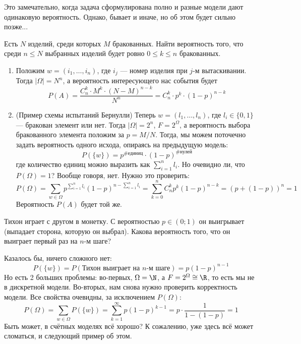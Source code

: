 \begin{itemize}
\begin{enumerate}
		\begin{note}
			Это замечательно, когда задача сформулирована полно и разные модели дают одинаковую вероятность. Однако, бывает и иначе, но об этом будет сильно позже...
		\end{note}
	
		\begin{example}
			Есть $N$ изделий, среди которых $M$ бракованных. Найти вероятность того, что среди $n \le N$ выбранных изделий будет ровно $0 \le k \le n$ бракованных.
		
			\begin{enumerate}
				\item Положим $w = (i_1, \ldots, i_n)$, где $i_j$ --- номер изделия при $j$-м вытаскивании. Тогда $|\Omega| = N^n$, а вероятность интересующего нас события будет
				\[
					P(A) = \frac{C_n^k \cdot M^k \cdot (N - M)^{n - k}}{N^n} = C_n^k \cdot p^k \cdot (1 - p)^{n - k}
				\]
				
				\item (Пример схемы испытаний Бернулли) Теперь $w = (l_1, \ldots, l_n)$, где $l_i \in \{0, 1\}$ --- бракован элемент или нет. Тогда $|\Omega| = 2^n$, $F = 2^\Omega$, а вероятность выбора бракованного элемента положим за $p = M / N$. Тогда, мы можем поточечно задать вероятность одного исхода, опираясь на предыдущую модель:
				\[
					P(\{w\}) = p^{\text{\#единиц}} \cdot (1 - p)^{\text{\#нулей}}
				\]
				где количество единиц можно выразить как $\sum_{i = 1}^n l_i$. Но очевидно ли, что $P(\Omega) = 1$? Вообще говоря, нет. Нужно это проверить:
				\[
					P(\Omega) = \sum_{w \in \Omega} p^{\sum_{i = 1}^n l_i} (1 - p)^{n - \sum_{i = 1}^n l_i} = \sum_{k = 0}^n C_n^k p^k (1 - p)^{n - k} = (p + (1 - p))^n = 1
				\]
				Вероятность $P(A)$ будет той же.
			\end{enumerate}
		\end{example}
	
		\begin{example}
			Тихон играет с другом в монетку. С вероятностью $p \in (0; 1)$ он выигрывает (выпадает сторона, которую он выбрал). Какова вероятность того, что он выиграет первый раз на $n$-м шаге?
			
			Казалось бы, ничего сложного нет:
			\[
				P(\{w\}) = P(\text{Тихон выиграет на $n$-м шаге}) = p(1 - p)^{n - 1}
			\]
			Но есть 2 больших проблемы: во-первых, $\Omega = \N$, а $F = 2^\Omega \cong \R$, то есть мы не в дискретной модели. Во-вторых, нам снова нужно проверить корректность модели. Все свойства очевидны, за исключением $P(\Omega)$:
			\[
				P(\Omega) = \sum_{w \in \Omega} P(\{w\}) = \sum_{k = 1}^\infty p(1 - p)^{k - 1} = p \cdot \frac{1}{1 - (1 - p)} = 1
			\]
			Быть может, в счётных моделях всё хорошо? К сожалению, уже здесь всё может сломаться, и следующий пример об этом.
		\end{example}
	

\end{enumerate}
\end{itemize}
